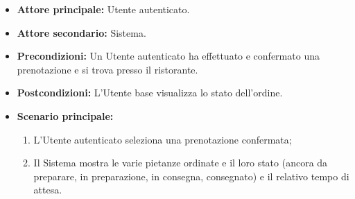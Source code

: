\label{usecase:Visualizzazione dello stato di un ordine}
\begin{itemize}
	\item \textbf{Attore principale:} Utente autenticato.

	\item \textbf{Attore secondario:} Sistema.

	\item \textbf{Precondizioni:}
	      Un Utente autenticato ha effettuato e confermato una prenotazione e si trova presso il ristorante.

	\item \textbf{Postcondizioni:}
	      L'Utente base visualizza lo stato dell'ordine.

	\item \textbf{Scenario principale:}
	      \begin{enumerate}
		      \item L'Utente autenticato seleziona una prenotazione confermata;
		      \item Il Sistema mostra le varie pietanze ordinate e il loro stato 
			  (ancora da preparare, in preparazione, in consegna, consegnato) 
			  e il relativo tempo di attesa.
	      \end{enumerate}
\end{itemize}
